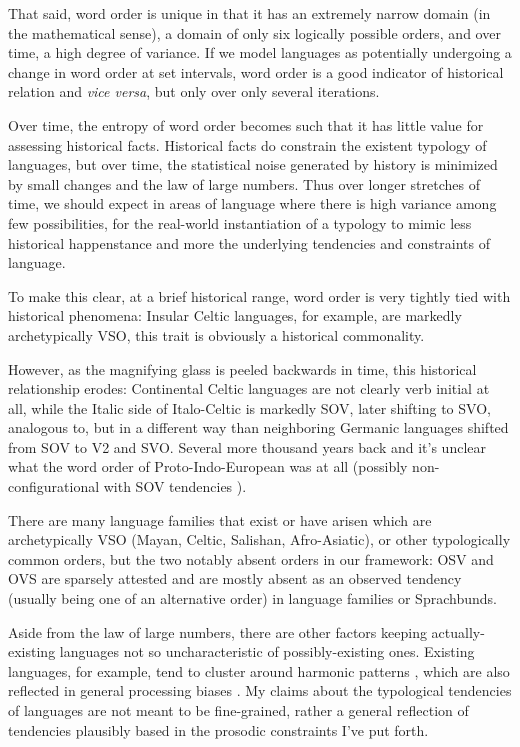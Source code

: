 \documentclass{article}
\begin{document}
That said, word order is unique in that it has an extremely narrow domain (in the mathematical sense), a domain of only six logically possible orders, and over time, a high degree of variance. If we model languages as potentially undergoing a change in word order at set intervals, word order is a good indicator of historical relation and \textit{vice versa}, but only over only several iterations.

Over time, the entropy of word order becomes such that it has little value for assessing historical facts. Historical facts do constrain the existent typology of languages, but over time, the statistical noise generated by history is minimized by small changes and the law of large numbers. Thus over longer stretches of time, we should expect in areas of language where there is high variance among few possibilities, for the real-world instantiation of a typology to mimic less historical happenstance and more the underlying tendencies and constraints of language.

To make this clear, at a brief historical range, word order is very tightly tied with historical phenomena: Insular Celtic languages, for example, are markedly archetypically VSO, this trait is obviously a historical commonality.

However, as the magnifying glass is peeled backwards in time, this historical relationship erodes: Continental Celtic languages are not clearly verb initial at all, while the Italic side of Italo-Celtic is markedly SOV, later shifting to SVO, analogous to, but in a different way than neighboring Germanic languages shifted from SOV to V2 and SVO. Several more thousand years back and it's unclear what the word order of Proto-Indo-European was at all (possibly non-configurational with SOV tendencies \parencite{fortson04}).

There are many language families that exist or have arisen which are archetypically VSO (Mayan, Celtic, Salishan, Afro-Asiatic), or other typologically common orders, but the two notably absent orders in our framework: OSV and OVS are sparsely attested and are mostly absent as an observed tendency (usually being one of an alternative order) in language families or Sprachbunds.

Aside from the law of large numbers, there are other factors keeping actually-existing languages not so uncharacteristic of possibly-existing ones. Existing languages, for example, tend to cluster around harmonic patterns \parencite{cinque}, which are also reflected in general processing biases \parencite{culbertson15}. My claims about the typological tendencies of languages are not meant to be fine-grained, rather a general reflection of tendencies plausibly based in the prosodic constraints I've put forth.
\end{document}
